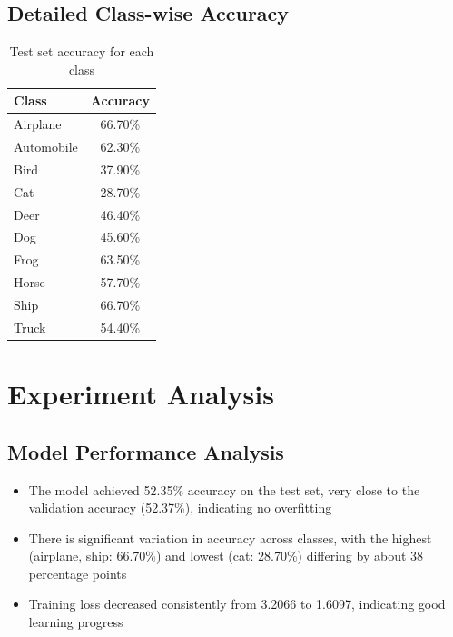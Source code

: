 \documentclass[12pt]{article}
\begin{document}
\subsection{Detailed Class-wise Accuracy}
\begin{table}[H]
    \centering
    \begin{tabular}{lc}
        \toprule
        Class & Accuracy \\
        \midrule
        Airplane & 66.70\% \\
        Automobile & 62.30\% \\
        Bird & 37.90\% \\
        Cat & 28.70\% \\
        Deer & 46.40\% \\
        Dog & 45.60\% \\
        Frog & 63.50\% \\
        Horse & 57.70\% \\
        Ship & 66.70\% \\
        Truck & 54.40\% \\
        \bottomrule
    \end{tabular}
    \caption{Test set accuracy for each class}
    \label{tab:class_acc}
\end{table}

\section{Experiment Analysis}

\subsection{Model Performance Analysis}
\begin{itemize}
    \item The model achieved 52.35\% accuracy on the test set, very close to the validation accuracy (52.37\%), indicating no overfitting
    \item There is significant variation in accuracy across classes, with the highest (airplane, ship: 66.70\%) and lowest (cat: 28.70\%) differing by about 38 percentage points
    \item Training loss decreased consistently from 3.2066 to 1.6097, indicating good learning progress
\end{itemize}
\end{document}
